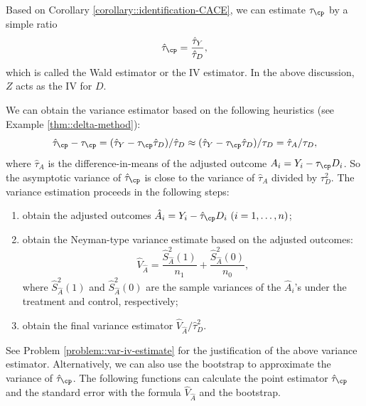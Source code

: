 Based on Corollary \ref{corollary::identification-CACE},  we can estimate $\tau_\cp$ by a simple ratio 
$$
\hat{\tau}_\cp  = \frac{  \hat{\tau}_Y }{  \hat{\tau}_D  } ,
$$ 
which is called the Wald estimator \citep{wald1940fitting} or the IV estimator. In the above discussion, $Z$ acts as the IV for $D$.   



We can obtain the variance estimator based on the following heuristics (see Example \ref{thm::delta-method}):
$$
\hat{\tau}_\cp - \tau_\cp  = ( \hat{\tau}_Y  -  \tau_\cp\hat{\tau}_D)/\hat{\tau}_D 
\approx  ( \hat{\tau}_Y  -  \tau_\cp\hat{\tau}_D)/ \tau_D 
= \hat{\tau}_A / \tau_D ,
$$ 
where $\hat{\tau}_A$ is the difference-in-means of the adjusted outcome $A_i = Y_i -  \tau_\cp D_i$. So the asymptotic variance of $\hat{\tau}_\cp$ is close to the  variance  of $\hat{\tau}_A$ divided by $\tau_D^2$. 
The variance estimation proceeds in the following steps: 
\begin{enumerate}
\item
obtain the adjusted outcomes $\hat{A}_i =  Y_i -  \hat{\tau}_\cp D_i\ (i=1, \ldots, n)$;

\item
obtain the Neyman-type variance estimate based on the adjusted outcomes:
$$
\hat{V}_{\hat{A}} = \frac{\hat{S}_{\hat{A}}^2(1)}{n_1} + \frac{\hat{S}_{\hat{A}}^2(0)}{n_0},
$$
where $\hat{S}_{\hat{A}}^2(1)$ and $\hat{S}_{\hat{A}}^2(0)$ are the sample variances of the $\hat{A}_i $'s under the treatment and control, respectively; 

\item
obtain the final variance estimator   $ \hat{V}_{\hat{A}} /  \hat{\tau}_D ^2 .$ 
\end{enumerate}


See Problem \ref{problem::var-iv-estimate} for the justification of the above variance estimator. Alternatively, we can also use the bootstrap to approximate the variance of $\hat{\tau}_\cp $.
The following functions can calculate the point estimator $\hat{\tau}_\cp $ and the standard error with the formula $\hat{V}_{\hat{A}} $ and the bootstrap. 

